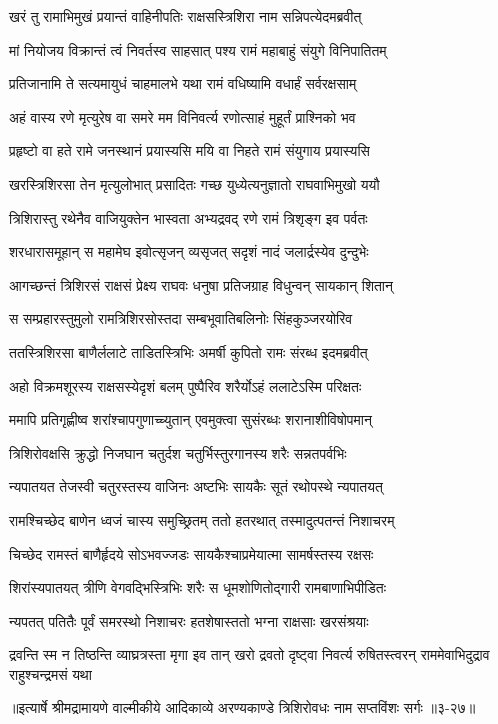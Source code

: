
\twolineshloka
{खरं तु रामाभिमुखं प्रयान्तं वाहिनीपतिः}
{राक्षसस्त्रिशिरा नाम सन्निपत्येदमब्रवीत्} %

\twolineshloka
{मां नियोजय विक्रान्तं त्वं निवर्तस्व साहसात्}
{पश्य रामं महाबाहुं संयुगे विनिपातितम्} %

\twolineshloka
{प्रतिजानामि ते सत्यमायुधं चाहमालभे}
{यथा रामं वधिष्यामि वधार्हं सर्वरक्षसाम्} %

\twolineshloka
{अहं वास्य रणे मृत्युरेष वा समरे मम}
{विनिवर्त्य रणोत्साहं मुहूर्तं प्राश्निको भव} %

\twolineshloka
{प्रहृष्टो वा हते रामे जनस्थानं प्रयास्यसि}
{मयि वा निहते रामं संयुगाय प्रयास्यसि} %

\twolineshloka
{खरस्त्रिशिरसा तेन मृत्युलोभात् प्रसादितः}
{गच्छ युध्येत्यनुज्ञातो राघवाभिमुखो ययौ} %

\twolineshloka
{त्रिशिरास्तु रथेनैव वाजियुक्तेन भास्वता}
{अभ्यद्रवद् रणे रामं त्रिशृङ्ग इव पर्वतः} %

\twolineshloka
{शरधारासमूहान् स महामेघ इवोत्सृजन्}
{व्यसृजत् सदृशं नादं जलार्द्रस्येव दुन्दुभेः} %

\twolineshloka
{आगच्छन्तं त्रिशिरसं राक्षसं प्रेक्ष्य राघवः}
{धनुषा प्रतिजग्राह विधुन्वन् सायकान् शितान्} %

\twolineshloka
{स सम्प्रहारस्तुमुलो रामत्रिशिरसोस्तदा}
{सम्बभूवातिबलिनोः सिंहकुञ्जरयोरिव} %

\twolineshloka
{ततस्त्रिशिरसा बाणैर्ललाटे ताडितस्त्रिभिः}
{अमर्षी कुपितो रामः संरब्ध इदमब्रवीत्} %

\twolineshloka
{अहो विक्रमशूरस्य राक्षसस्येदृशं बलम्}
{पुष्पैरिव शरैर्योऽहं ललाटेऽस्मि परिक्षतः} %

\twolineshloka
{ममापि प्रतिगृह्णीष्व शरांश्चापगुणाच्च्युतान्}
{एवमुक्त्वा सुसंरब्धः शरानाशीविषोपमान्} %

\twolineshloka
{त्रिशिरोवक्षसि क्रुद्धो निजघान चतुर्दश}
{चतुर्भिस्तुरगानस्य शरैः सन्नतपर्वभिः} %

\twolineshloka
{न्यपातयत तेजस्वी चतुरस्तस्य वाजिनः}
{अष्टभिः सायकैः सूतं रथोपस्थे न्यपातयत्} %

\twolineshloka
{रामश्चिच्छेद बाणेन ध्वजं चास्य समुच्छ्रितम्}
{ततो हतरथात् तस्मादुत्पतन्तं निशाचरम्} %

\twolineshloka
{चिच्छेद रामस्तं बाणैर्हृदये सोऽभवज्जडः}
{सायकैश्चाप्रमेयात्मा सामर्षस्तस्य रक्षसः} %

\twolineshloka
{शिरांस्यपातयत् त्रीणि वेगवद्भिस्त्रिभिः शरैः}
{स धूमशोणितोद्गारी रामबाणाभिपीडितः} %

\twolineshloka
{न्यपतत् पतितैः पूर्वं समरस्थो निशाचरः}
{हतशेषास्ततो भग्ना राक्षसाः खरसंश्रयाः} %

\threelineshloka
{द्रवन्ति स्म न तिष्ठन्ति व्याघ्रत्रस्ता मृगा इव}
{तान् खरो द्रवतो दृष्ट्वा निवर्त्य रुषितस्त्वरन्}
{राममेवाभिदुद्राव राहुश्चन्द्रमसं यथा} %


॥इत्यार्षे श्रीमद्रामायणे वाल्मीकीये आदिकाव्ये अरण्यकाण्डे त्रिशिरोवधः नाम सप्तविंशः सर्गः ॥३-२७॥

